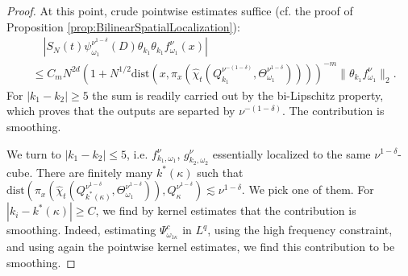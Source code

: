 \documentclass{amsart}
\numberwithin{equation}{section}
\theoremstyle{definition}
\begin{document}
\begin{proof}
At this point, crude pointwise estimates suffice (cf. the proof of Proposition \ref{prop:BilinearSpatialLocalization}):
\begin{equation*}
\begin{split}
    &\quad |S_N(t) \psi_{\omega_1}^{\nu^{1-\delta}}(D) \theta_{k_1} \theta_{k_1} f_{\omega_1}^{\nu}(x)| \\
    &\leq C_m N^{2d} (1+ N^{1/2} \text{dist}(x,\pi_x(\hat{\chi}_t(Q_{k_1}^{\nu^{-(1-\delta)}},\Theta_{\omega_1}^{\nu^{1-\delta}}))))^{-m} \| \theta_{k_1} f_{\omega_1}^{\nu} \|_2.
\end{split}
\end{equation*}
For $|k_1 - k_2| \geq 5$ the sum is readily carried out by the bi-Lipschitz property, which proves that the outputs are separted by $\nu^{-(1-\delta)}$. The contribution is smoothing.

\smallskip

We turn to $|k_1-k_2| \leq 5$, i.e. $f_{k_1,\omega_1}^{\nu}$, $g_{k_2,\omega_2}^{\nu}$ essentially localized to the same $\nu^{1-\delta}$-cube. There are finitely many $k^*(\kappa)$ such that $\text{dist}(\pi_x(\hat{\chi}_t(Q_{k^*(\kappa)}^{\nu^{1-\delta}},\Theta_{\omega_1}^{\nu^{1-\delta}})), Q_{\kappa}^{\nu^{1-\delta}}) \lesssim \nu^{1-\delta}$. We pick one of them. For $|k_i-k^*(\kappa)| \geq C$, we find by kernel estimates that the contribution is smoothing. 
Indeed, estimating $\Psi_{\omega_{1 \kappa}}^c$ in $L^q$, using the high frequency constraint, and using again the pointwise kernel estimates, we find this contribution to be smoothing.


\end{proof}
\end{document}
